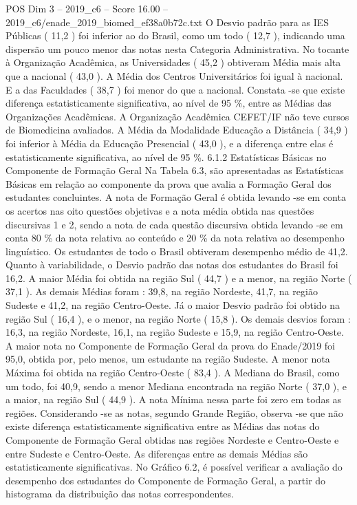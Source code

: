 \begin{textsample}{POS Dim 3 – 2019\_c6 – Score 16.00 – 2019\_c6/enade\_2019\_biomed\_ef38a0b72c.txt}
O Desvio padrão para as IES Públicas ( 11,2 ) foi inferior ao do Brasil, como um todo ( 12,7 ), indicando uma dispersão um pouco menor das notas nesta Categoria Administrativa.
No tocante à Organização Acadêmica, as Universidades ( 45,2 ) obtiveram Média mais alta que a nacional ( 43,0 ).
A Média dos Centros Universitários foi igual à nacional.
E a das Faculdades ( 38,7 ) foi menor do que a nacional.
Constata -se que existe diferença estatisticamente significativa, ao nível de 95 \%, entre as Médias das Organizações Acadêmicas.
A Organização Acadêmica CEFET/IF não teve cursos de Biomedicina avaliados.
A Média da Modalidade Educação a Distância ( 34,9 ) foi inferior à Média da Educação Presencial ( 43,0 ), e a diferença entre elas é estatisticamente significativa, ao nível de 95 \%. 6.1.2 Estatísticas Básicas no Componente de Formação Geral Na Tabela 6.3, são apresentadas as Estatísticas Básicas em relação ao componente da prova que avalia a Formação Geral dos estudantes concluintes.
A nota de Formação Geral é obtida levando -se em conta os acertos nas oito questões objetivas e a nota média obtida nas questões discursivas 1 e 2, sendo a nota de cada questão discursiva obtida levando -se em conta 80 \% da nota relativa ao conteúdo e 20 \% da nota relativa ao desempenho linguístico.
Os estudantes de todo o Brasil obtiveram desempenho médio de 41,2.
Quanto à variabilidade, o Desvio padrão das notas dos estudantes do Brasil foi 16,2.
A maior Média foi obtida na região Sul ( 44,7 ) e a menor, na região Norte ( 37,1 ).
As demais Médias foram : 39,8, na região Nordeste, 41,7, na região Sudeste e 41,2, na região Centro-Oeste.
Já o maior Desvio padrão foi obtido na região Sul ( 16,4 ), e o menor, na região Norte ( 15,8 ).
Os demais desvios foram : 16,3, na região Nordeste, 16,1, na região Sudeste e 15,9, na região Centro-Oeste.
A maior nota no Componente de Formação Geral da prova do Enade/2019 foi 95,0, obtida por, pelo menos, um estudante na região Sudeste.
A menor nota Máxima foi obtida na região Centro-Oeste ( 83,4 ).
A Mediana do Brasil, como um todo, foi 40,9, sendo a menor Mediana encontrada na região Norte ( 37,0 ), e a maior, na região Sul ( 44,9 ).
A nota Mínima nessa parte foi zero em todas as regiões.
Considerando -se as notas, segundo Grande Região, observa -se que não existe diferença estatisticamente significativa entre as Médias das notas do Componente de Formação Geral obtidas nas regiões Nordeste e Centro-Oeste e entre Sudeste e Centro-Oeste.
As diferenças entre as demais Médias são estatisticamente significativas.
No Gráfico 6.2, é possível verificar a avaliação do desempenho dos estudantes do Componente de Formação Geral, a partir do histograma da distribuição das notas correspondentes.

\end{textsample}
